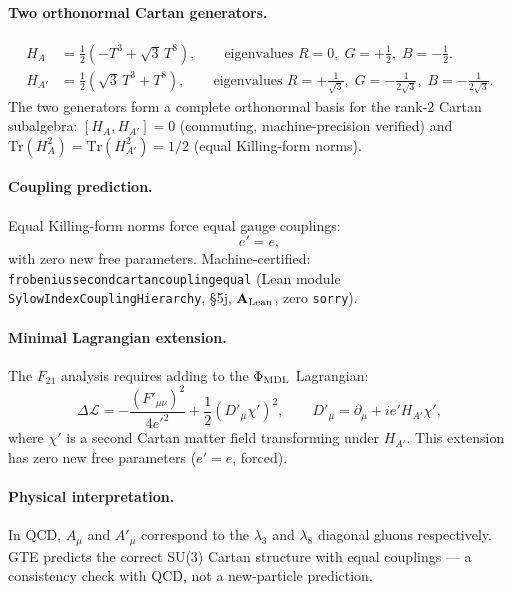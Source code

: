 \documentclass[11pt]{article}
\theoremstyle{remark}
\newcommand{\phimdl}{\Phi_{\rm MDL}}
\newcommand{\Ftwentyone}{F_{21}}
\newcommand{\lean}[1]{%
  \penalty-100
  \begingroup\def\_{\textunderscore\allowbreak}\texttt{#1}\endgroup}
\newcommand{\CatAL}{\ensuremath{\textbf{A}_{\rm Lean}}}
\begin{document}
\paragraph{Two orthonormal Cartan generators.}
\begin{align}
  H_A &= \frac{1}{2}\left(-T^3 + \sqrt{3}\,T^8\right),
    \qquad \text{eigenvalues } R=0,\; G=+\tfrac{1}{2},\; B=-\tfrac{1}{2}. \\
  H_{A'} &= \frac{1}{2}\left(\sqrt{3}\,T^3 + T^8\right),
    \qquad \text{eigenvalues } R=+\tfrac{1}{\sqrt{3}},\; G=-\tfrac{1}{2\sqrt{3}},\;
      B=-\tfrac{1}{2\sqrt{3}}.
\end{align}
The two generators form a complete orthonormal basis for the rank-2 Cartan
subalgebra: $[H_A, H_{A'}] = 0$ (commuting, machine-precision verified) and
$\mathrm{Tr}(H_A^2) = \mathrm{Tr}(H_{A'}^2) = 1/2$ (equal Killing-form norms).

\paragraph{Coupling prediction.}
Equal Killing-form norms force equal gauge couplings:
\begin{equation}
  e' = e,
  \label{eq:eprime}
\end{equation}
with zero new free parameters.
Machine-certified: \lean{frobenius\_second\_cartan\allowbreak\_coupling\_equal}
(Lean module \lean{SylowIndexCouplingHierarchy},
§5j, \CatAL{}, zero \texttt{sorry}).

\paragraph{Minimal Lagrangian extension.}
The $\Ftwentyone$ analysis requires adding to the $\phimdl$ Lagrangian:
\begin{equation}
  \Delta\mathcal{L} = -\frac{(F'_{\mu\nu})^2}{4e'^2}
    + \frac{1}{2}\left(D'_\mu \chi'\right)^2,
  \qquad
  D'_\mu = \partial_\mu + ie' H_{A'} \chi',
  \label{eq:laprime}
\end{equation}
where $\chi'$ is a second Cartan matter field transforming under $H_{A'}$.
This extension has zero new free parameters ($e' = e$, forced).

\paragraph{Physical interpretation.}
In QCD, $A_\mu$ and $A'_\mu$ correspond to the $\lambda_3$ and $\lambda_8$
diagonal gluons respectively.
GTE predicts the correct SU(3) Cartan structure with equal couplings --- a
consistency check with QCD, not a new-particle prediction.
\end{document}
